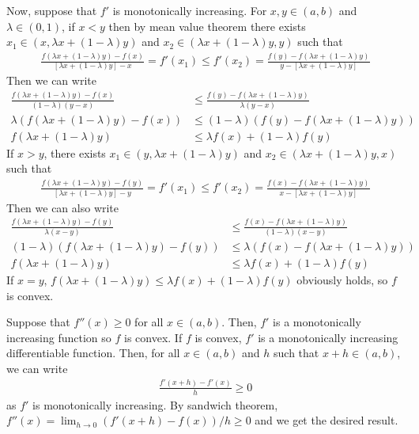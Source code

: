 \documentclass{scrartcl}
\begin{document}
Now, suppose that \(f'\) is monotonically increasing.
For \(x, y \in (a, b)\) and \(\lambda \in (0, 1)\), if \(x < y\) then by mean value theorem there exists \(x_1 \in (x, \lambda x + (1 - \lambda) y)\) and \(x_2 \in (\lambda x + (1 - \lambda) y, y)\) such that
\begin{align*}
  \frac{f(\lambda x + (1 - \lambda) y) - f(x)}{[\lambda x + (1 - \lambda) y] - x} = f'(x_1)
  \leq f'(x_2) = \frac{f(y) - f(\lambda x + (1 - \lambda) y)}{y - [\lambda x + (1 - \lambda) y]}
\end{align*}
Then we can write
\begin{align*}
  \frac{f(\lambda x + (1 - \lambda) y) - f(x)}{(1 - \lambda)(y - x)}
  &\leq \frac{f(y) - f(\lambda x + (1 - \lambda) y)}{\lambda (y - x)} \\
  \lambda (f(\lambda x + (1 - \lambda) y) - f(x)) &\leq (1 - \lambda)(f(y) - f(\lambda x + (1 - \lambda) y)) \\
  f(\lambda x + (1 - \lambda) y) &\leq \lambda f(x) + (1 - \lambda) f(y)
\end{align*}
If \(x > y\), there exists \(x_1 \in (y, \lambda x + (1 - \lambda) y)\) and \(x_2 \in (\lambda x + (1 - \lambda) y, x)\) such that
\begin{align*}
  \frac{f(\lambda x + (1 - \lambda) y) - f(y)}{[\lambda x + (1 - \lambda) y] - y} = f'(x_1)
  \leq f'(x_2) = \frac{f(x) - f(\lambda x + (1 - \lambda) y)}{x - [\lambda x + (1 - \lambda) y]}
\end{align*}
Then we can also write
\begin{align*}
  \frac{f(\lambda x + (1 - \lambda) y) - f(y)}{\lambda (x - y)}
  &\leq \frac{f(x) - f(\lambda x + (1 - \lambda) y)}{(1 - \lambda)(x - y)} \\
  (1 - \lambda)(f(\lambda x + (1 - \lambda) y) - f(y)) &\leq \lambda (f(x) - f(\lambda x + (1 - \lambda) y)) \\
  f(\lambda x + (1 - \lambda) y) &\leq \lambda f(x) + (1 - \lambda) f(y)
\end{align*}
If \(x = y\), \(f(\lambda x + (1 - \lambda) y) \leq \lambda f(x) + (1 - \lambda) f(y)\) obviously holds, so \(f\) is convex.

Suppose that \(f''(x) \geq 0\) for all \(x \in (a, b)\).
Then, \(f'\) is a monotonically increasing function so \(f\) is convex.
If \(f\) is convex, \(f'\) is a monotonically increasing differentiable function.
Then, for all \(x \in (a, b)\) and \(h\) such that \(x + h \in (a, b)\), we can write
\begin{align*}
  \frac{f'(x + h) - f'(x)}{h} \geq 0
\end{align*}
as \(f'\) is monotonically increasing.
By sandwich theorem, \(f''(x) = \lim_{h \to 0} (f'(x + h) - f(x)) / h \geq 0\) and we get the desired result.
\end{document}
